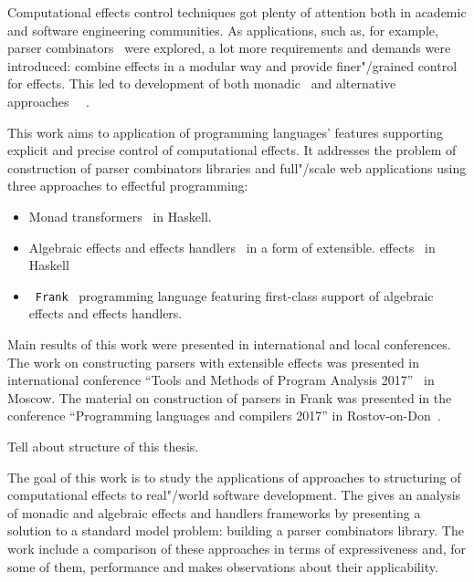 Computational effects control techniques got plenty of attention both in academic and software engineering communities. As applications, such as, for example, parser combinators~\cite{monParsing} were explored, a lot more requirements and demands
were introduced: combine effects in a modular way and provide finer"/grained control
for effects. This led to development of both monadic~\cite{Liang:1995:MTM:199448.199528} and alternative approaches~\cite{Mcbride:2008:APE:1348940.1348941}
~\cite{DBLP:journals/jlp/BauerP15}.

This work aims to application of programming languages' features supporting explicit
and precise control of computational effects. It addresses the problem
of construction of parser combinators libraries and full"/scale web applications
using three approaches to effectful programming:

\begin{itemize}
  \item Monad transformers~\cite{Liang:1995:MTM:199448.199528} in Haskell.
  \item Algebraic effects and effects handlers~\cite{DBLP:journals/jlp/BauerP15}
  in a form of extensible.
  effects~\cite{Kiselyov:2013:EEA:2578854.2503791} in Haskell
  \item~\texttt{Frank}~\cite{DBLP:conf/popl/LindleyMM17} programming language featuring first-class support of algebraic
  effects and effects handlers.
\end{itemize}

Main results of this work were presented in international and local conferences.
The work on constructing parsers with extensible effects was presented in 
international conference ``Tools and Methods of Program Analysis 2017''~\cite{tmpaExtEffects}
in Moscow. The material on construction of parsers in Frank was presented in the
conference ``Programming languages and compilers 2017'' in Rostov-on-Don~\cite{plcFrank}.

Tell about structure of this thesis.

\Goal

The goal of this work is to study the applications of approaches to structuring
of computational effects to real"/world software development. The gives an analysis
of monadic and algebraic effects and handlers frameworks by presenting a solution
to a standard model problem: building a parser combinators library. The work
include a comparison of these approaches in terms of expressiveness and, for some of them,
performance and makes observations about their applicability.


